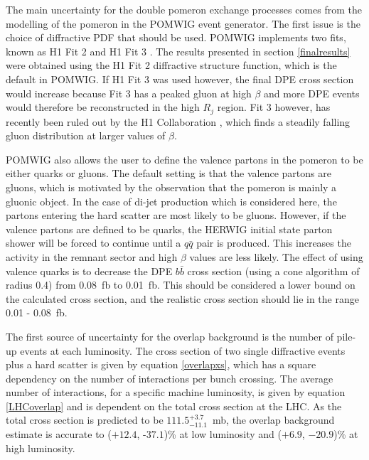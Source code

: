 
The main uncertainty for the double pomeron exchange processes comes from the modelling of the pomeron in the POMWIG event generator. The first issue is the choice of diffractive PDF that should be used. POMWIG implements two fits, known as H1 Fit 2 and H1 Fit 3 \cite{Adloff:1997sc}. The results presented in section \ref{finalresults} were obtained using the H1 Fit 2 diffractive structure function, which is the default in POMWIG. %
If H1 Fit 3 was used however, the final DPE cross section would increase because Fit 3 has a peaked gluon at high $\beta$ and more DPE events would therefore be reconstructed in the high $R_{j}$ region.
Fit 3 however, has recently been ruled out by the H1 Collaboration \cite{unknown:2006hx}, which finds a steadily falling gluon distribution at larger values of $\beta$. 

POMWIG also allows the user to define the valence partons in the pomeron to be either quarks or gluons. The default setting is that the valence partons are gluons, which is motivated by the observation that the pomeron is mainly a gluonic object. In the case of di-jet production which is considered here, the partons entering the hard scatter are most likely to be gluons. However, if the valence partons are defined to be quarks, the HERWIG initial state parton shower will be forced to continue until a $q\bar{q}$ pair is produced. This increases the activity in the remnant sector and high $\beta$ values are less likely. The effect of using valence quarks is to decrease the DPE $b\bar{b}$ cross section (using a cone algorithm of radius 0.4) from 0.08~fb to 0.01~fb. This should be considered a lower bound on the calculated cross section, and the realistic cross section should lie in the range 0.01 - 0.08~fb.

The first source of uncertainty for the overlap background is the number of pile-up events at each luminosity. The cross section of two single diffractive events plus a hard scatter is given by equation \ref{overlapxs}, which has a square dependency on the number of interactions per bunch crossing. The average number of interactions, for a specific machine luminosity, is given by equation \ref{LHCoverlap} and is dependent on the total cross section at the LHC. As the total cross section is predicted to be $111.5^{+3.7}_{-11.1}$~mb, the overlap background estimate is accurate to ($+12.4$, -$37.1$)\% at low luminosity and ($+6.9$, $-20.9$)\% at high luminosity. 

